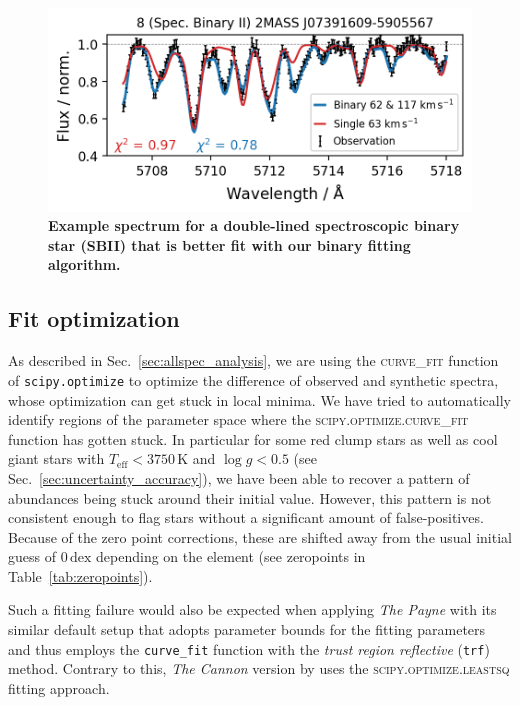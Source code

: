 \documentclass[
  journal=pasa,
  manuscript=research-paper, %
  year=2024,
  volume=37
]{cup-journal}
\begin{document}
\begin{figure}[ht]
 \centering
 \includegraphics[width=\textwidth]{figures/examples_flag_sp_3.png}
 \caption{\textbf{Example spectrum for a double-lined spectroscopic binary star (SBII) that is better fit with our binary fitting algorithm.}} \label{fig:examples_flag_sp_3}
\end{figure}

\subsection{Fit optimization} \label{sec:caveats_fitting}

As described in Sec.~\ref{sec:allspec_analysis}, we are using the \textsc{curve\_fit} function of \texttt{scipy.optimize} \citep{scipy} to optimize the difference of observed and synthetic spectra, whose optimization can get stuck in local minima. We have tried to automatically identify regions of the parameter space where the \textsc{scipy.optimize.curve\_fit} function has gotten stuck. In particular for some red clump stars as well as cool giant stars with $T_\mathrm{eff} < 3750\,\mathrm{K}$ and $\log g < 0.5$ (see Sec.~\ref{sec:uncertainty_accuracy}), we have been able to recover a pattern of abundances being stuck around their initial value. However, this pattern is not consistent enough to flag stars without a significant amount of false-positives. Because of the zero point corrections, these are shifted away from the usual initial guess of $0\,\mathrm{dex}$ depending on the element (see zeropoints in Table~\ref{tab:zeropoints}).

Such a fitting failure would also be expected when applying \textit{The Payne} \citep{Ting2019} with its similar default setup that adopts parameter bounds for the fitting parameters and thus employs the \texttt{curve\_fit} function with the \textit{trust region reflective} (\texttt{trf}) method. Contrary to this, \textit{The Cannon} version by \citep{Casey2016} uses the \textsc{scipy.optimize.leastsq} fitting approach.
\end{document}
